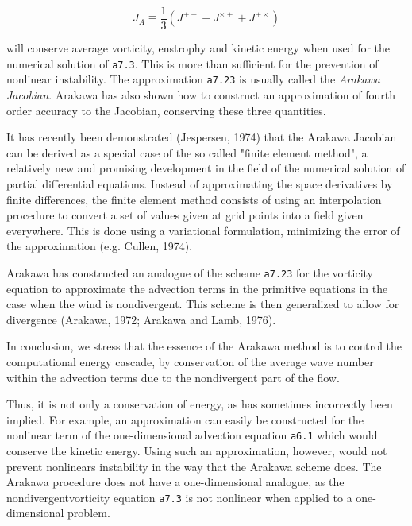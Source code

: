 \[J_{A} \equiv \frac{1}{3}\left( J^{+ +} + J^{\times +} + J^{+ \times} \right)\]

will conserve average vorticity, enstrophy and kinetic energy when used
for the numerical solution of \texttt{a7.3}. This is more than
sufficient for the prevention of nonlinear instability. The
approximation \texttt{a7.23} is usually called the \emph{Arakawa
Jacobian}. Arakawa has also shown how to construct an approximation of
fourth order accuracy to the Jacobian, conserving these three
quantities.

It has recently been demonstrated (Jespersen, 1974) that the Arakawa
Jacobian can be derived as a special case of the so called "finite
element method", a relatively new and promising development in the field
of the numerical solution of partial differential equations. Instead of
approximating the space derivatives by finite differences, the finite
element method consists of using an interpolation procedure to convert a
set of values given at grid points into a field given everywhere. This
is done using a variational formulation, minimizing the error of the
approximation (e.g. Cullen, 1974).

Arakawa has constructed an analogue of the scheme \texttt{a7.23} for the
vorticity equation to approximate the advection terms in the primitive
equations in the case when the wind is nondivergent. This scheme is then
generalized to allow for divergence (Arakawa, 1972; Arakawa and Lamb,
1976).

In conclusion, we stress that the essence of the Arakawa method is to
control the computational energy cascade, by conservation of the average
wave number within the advection terms due to the nondivergent part of
the flow.

Thus, it is not only a conservation of energy, as has sometimes
incorrectly been implied. For example, an approximation can easily be
constructed for the nonlinear term of the one-dimensional advection
equation \texttt{a6.1} which would conserve the kinetic energy. Using
such an approximation, however, would not prevent nonlinears instability
in the way that the Arakawa scheme does. The Arakawa procedure does not
have a one-dimensional analogue, as the nondivergentvorticity equation
\texttt{a7.3} is not nonlinear when applied to a one-dimensional
problem.